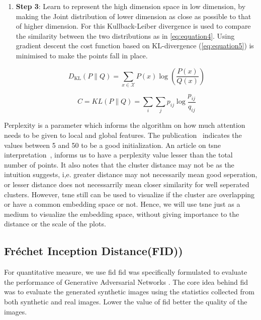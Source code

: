 \begin{enumerate}
    \item \textbf{Step 3}: Learn to represent the high dimension space in low dimension, by making the Joint distribution of lower dimension as close as possible to that of higher dimension.
    For this Kullback-Leiber divergence\cite{Joyce2011} is used to compare the similarity between the two distributions as in \autoref{eq:equation4}.
    Using gradient descent the cost function based on KL-divergence (\autoref{eq:equation5}) is minimised to make the points fall in place.

    \begin{equation}
        D_{\mathrm{KL}}(P \| Q)=\sum_{x \in \mathcal{X}} P(x) \log \left(\frac{P(x)}{Q(x)}\right)
        \label{eq:equation4}
    \end{equation}

    \begin{equation}
        C=K L(P \| Q)=\sum_{i} \sum_{j} p_{i j} \log \frac{p_{i j}}{q_{i j}}
        \label{eq:equation5}
    \end{equation}
\end{enumerate}

Perplexity is a parameter which informs the algorithm on how much attention needs to be given to local and global features.
The publication~\cite{vanDerMaaten2008} indicates the values between 5 and 50 to be a good initialization.
An article on \gls{tsne} interpretation~\cite{wattenberg2016how}, informs us to have a perplexity value lesser than the total number of points.
    It also notes that the cluster distance may not be as the intuition suggests, i,e. greater distance may not necessarily mean good seperation, or lesser distance does not necessarrily mean closer similarity for well seperated clusters.
    However, \gls{tsne} still can be used to visualize if the cluster are overlapping or have a common embedding space or not.
    Hence, we will use \gls{tsne} just as a medium to visualize the embedding space, without giving importance to the distance or the scale of the plots.

\subsection{Fr\'echet Inception Distance(FID))}\label{subsec:fr'echet-inception-distance)}
For quantitative measure, we use \gls{fid}
\gls{fid} \cite{Heusel2017GANsTB} was specifically formulated to evaluate the performance of Generative Adversarial Networks \cite{Goodfellow2014GenerativeAN}.
The core idea behind \gls{fid} was to evaluate the generated synthetic images using the statistics collected from both synthetic and real images.
Lower the value of \gls{fid} better the quality of the images.

